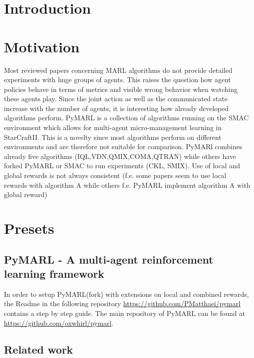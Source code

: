 \chapter{Introduction}


\chapter{Motivation}

Most reviewed papers concerning MARL algorithms do not provide detailed experiments with huge groups of agents. This raises the question how agent policies behave in terms of metrics and visible wrong behavior when watching these agents play. Since the joint action as well as the communicated state increase with the number of agents, it is interesting how already developed algorithms perform. PyMARL is a collection of algorithms running on the SMAC environment which allows for multi-agent micro-management learning in StarCraftII. This is a novelty since most algorithms perform on different environments and are therefore not suitable for comparison. PyMARl combines already five algorithms (IQL,VDN,QMIX,COMA,QTRAN) while others have forked PyMARL or SMAC to run experiments (CKL, SMIX). Use of local and global rewards is not always consistent (f.e. some papers seem to use local rewards with algorithm A while others f.e. PyMARL implement algorithm A with global reward)


\chapter{Presets}

\section{PyMARL - A multi-agent reinforcement learning framework}

In order to setup PyMARL(fork) with extensions on local and combined rewards, the Readme in the following repository \url{https://github.com/PMatthaei/pymarl} contains a step by step guide. The main repository of PyMARL can be found at \url{https://github.com/oxwhirl/pymarl}. \cite{samvelyan19smac}

\section{Related work}

